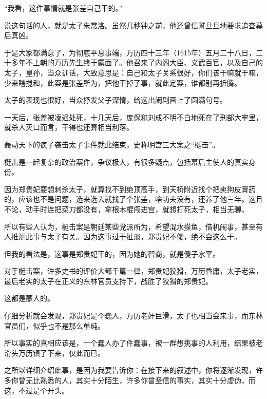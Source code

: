 \begin{multicols}{\theparacolNo}
		“我看，这件事情就是张差自己干的。”

		说这句话的人，就是太子朱常洛。虽然几秒钟之前，他还曾信誓旦旦地要求追查幕后真凶。

		于是大家都满意了，为彻底平息事端，万历四十三年（1615年）五月二十八日，二十多年不上朝的万历先生终于露面了。他召来了内阁大臣、文武百官，以及自己的太子，皇孙，当众训话，大致意思是：自己和太子关系很好，你们该干嘛就干嘛，少来瞎搅和，此案是张差所为，把他干掉了事，就此定案，谁都别再折腾。

		太子的表现也很好，当众抒发父子深情，给这出闹剧画上了圆满句号。

		一天后，张差被凌迟处死，十几天后，庞保和刘成不明不白地死在了刑部大牢里，就杀人灭口而言，干得也还算相当利落。

		轰动天下的疯子袭击太子事件就此结束，史称明宫三大案之“梃击”。

		梃击是一起复杂的政治案件，争议极大，有很多疑点，包括幕后主使人的真实身份。

		因为郑贵妃要想刺杀太子，就算找不到绝顶高手，到天桥附近找个把卖狗皮膏药的，应该也不是问题，选来选去就找了个张差，啥功夫没有，还养了他三年。这且不论，动手时连把菜刀都没有，拿根木棍闯进宫，就想打死太子，相当无聊。

		所以有些人认为，梃击案是朝廷某些党派所为，希望混水摸鱼，借机闹事，甚至有人推测此事与太子有关。因为这事过于扯淡，郑贵妃不傻，绝不会这么干。

		但我的看法是，这事是郑贵妃干的，因为她的智商，就是傻子水平。

		对于梃击案，许多史书的评价大都千篇一律，郑贵妃狡猾，万历昏庸，太子老实，最后老实的太子在正义的东林官员支持下，战胜了狡猾的郑贵妃。

		这都是蒙人的。

		仔细分析就会发现，郑贵妃是个蠢人，万历老奸巨滑，太子也相当会来事，而东林官员们，似乎也不是那么单纯。

		所以事实的真相应该是，一个蠢人办了件蠢事，被一群想挑事的人利用，结果被老滑头万历镇了下来，仅此而已。

		之所以详细介绍此事，是因为我要告诉你：在接下来的叙述中，你将逐渐发现，许多你曾无比熟悉的人，其实十分陌生，许多你曾坚信的事实，其实十分虚伪，而这，不过是个开头。

		\ifnum{}
	\end{multicols}
\fi
\newpage
